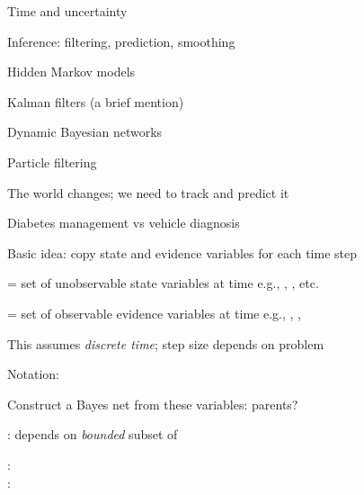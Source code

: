 \documentclass{article}
\begin{document}
\begin{huge}

\sf


\blob Time and uncertainty

\blob Inference: filtering, prediction, smoothing

\blob Hidden Markov models

\blob Kalman filters (a brief mention)

\blob Dynamic Bayesian networks

\blob Particle filtering



The world changes; we need to track and predict it

Diabetes management vs vehicle diagnosis

Basic idea: copy state and evidence variables for each time step

 = set of unobservable state variables at time \nl
    e.g., , , etc.

 = set of observable evidence variables at time \al
    e.g., , , 

This assumes \emph{discrete time}; step size depends on problem

Notation: 



Construct a Bayes net from these variables: parents?

:  depends on \emph{bounded} subset of 

: \\
: 

\vspace*{0.2in}

\textwidth
{}


\end{huge}
\end{document}
